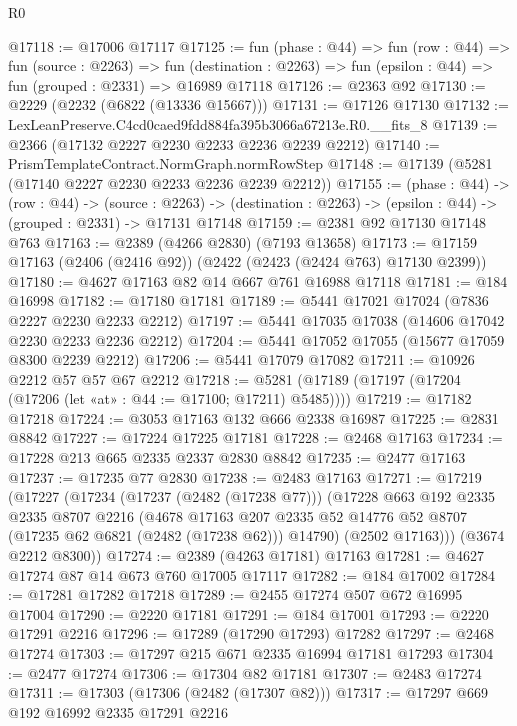 \begin{lexlean}{R0}
\begin{coremodule}
@17118 := @17006 @17117
@17125 := fun (phase : @44) =>
  fun (row : @44) =>
  fun (source : @2263) =>
  fun (destination : @2263) => fun (epsilon : @44) => fun (grouped : @2331) => @16989 @17118
@17126 := @2363 @92
@17130 := @2229 (@2232 (@6822 (@13336 @15667)))
@17131 := @17126 @17130
@17132 := LexLeanPreserve.C4cd0caed9fdd884fa395b3066a67213e.R0.__fits_8
@17139 := @2366 (@17132 @2227 @2230 @2233 @2236 @2239 @2212)
@17140 := PrismTemplateContract.NormGraph.normRowStep
@17148 := @17139 (@5281 (@17140 @2227 @2230 @2233 @2236 @2239 @2212))
@17155 := (phase : @44) ->
  (row : @44) ->
  (source : @2263) -> (destination : @2263) -> (epsilon : @44) -> (grouped : @2331) -> @17131 @17148
@17159 := @2381 @92 @17130 @17148 @763
@17163 := @2389 (@4266 @2830) (@7193 @13658)
@17173 := @17159 @17163 (@2406 (@2416 @92)) (@2422 (@2423 (@2424 @763) @17130 @2399))
@17180 := @4627 @17163 @82 @14 @667 @761 @16988 @17118
@17181 := @184 @16998
@17182 := @17180 @17181
@17189 := @5441 @17021 @17024 (@7836 @2227 @2230 @2233 @2212)
@17197 := @5441 @17035 @17038 (@14606 @17042 @2230 @2233 @2236 @2212)
@17204 := @5441 @17052 @17055 (@15677 @17059 @8300 @2239 @2212)
@17206 := @5441 @17079 @17082
@17211 := @10926 @2212 @57 @57 @67 @2212
@17218 := @5281 (@17189 (@17197 (@17204 (@17206 (let «at» : @44 := @17100; @17211) @5485))))
@17219 := @17182 @17218
@17224 := @3053 @17163 @132 @666 @2338 @16987
@17225 := @2831 @8842
@17227 := @17224 @17225 @17181
@17228 := @2468 @17163
@17234 := @17228 @213 @665 @2335 @2337 @2830 @8842
@17235 := @2477 @17163
@17237 := @17235 @77 @2830
@17238 := @2483 @17163
@17271 := @17219
    (@17227
      (@17234
        (@17237 (@2482 (@17238 @77)))
        (@17228
          @663
          @192
          @2335
          @2335
          @8707
          @2216
          (@4678
            @17163
            @207
            @2335
            @52
            @14776
            @52
            @8707
            (@17235 @62 @6821 (@2482 (@17238 @62)))
            @14790)
          (@2502 @17163)))
      (@3674 @2212 @8300))
@17274 := @2389 (@4263 @17181) @17163
@17281 := @4627 @17274 @87 @14 @673 @760 @17005 @17117
@17282 := @184 @17002
@17284 := @17281 @17282 @17218
@17289 := @2455 @17274 @507 @672 @16995 @17004
@17290 := @2220 @17181
@17291 := @184 @17001
@17293 := @2220 @17291 @2216
@17296 := @17289 (@17290 @17293) @17282
@17297 := @2468 @17274
@17303 := @17297 @215 @671 @2335 @16994 @17181 @17293
@17304 := @2477 @17274
@17306 := @17304 @82 @17181
@17307 := @2483 @17274
@17311 := @17303 (@17306 (@2482 (@17307 @82)))
@17317 := @17297 @669 @192 @16992 @2335 @17291 @2216

\end{coremodule}
\end{lexlean}
